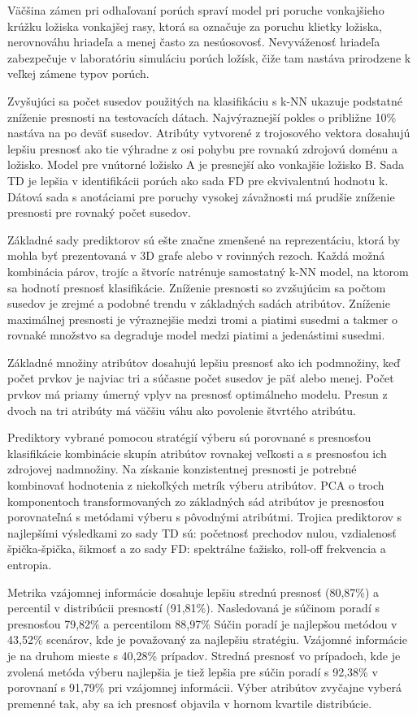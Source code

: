 Väčšina zámen pri odhaľovaní porúch spraví model pri poruche vonkajšieho krúžku ložiska vonkajšej rasy, ktorá sa označuje za poruchu klietky ložiska, nerovnováhu hriadeľa a menej často za nesúosovosť. Nevyváženosť hriadeľa zabezpečuje v laboratóriu simuláciu porúch ložísk, čiže tam nastáva prirodzene k veľkej zámene typov porúch.

Zvyšujúci sa počet susedov použitých na klasifikáciu s k-NN ukazuje podstatné zníženie presnosti na testovacích dátach. Najvýraznejší pokles o približne 10\% nastáva na po deväť susedov. Atribúty vytvorené z trojosového vektora dosahujú lepšiu presnosť ako tie výhradne z osi pohybu pre rovnakú zdrojovú doménu a ložisko. Model pre vnútorné ložisko A je presnejší ako vonkajšie ložisko B. Sada TD je lepšia v identifikácii porúch ako sada FD pre ekvivalentnú hodnotu k. Dátová sada s anotáciami pre poruchy vysokej závažnosti má prudšie zníženie presnosti pre rovnaký počet susedov.

Základné sady prediktorov sú ešte značne zmenšené na reprezentáciu, ktorá by mohla byť prezentovaná v 3D grafe alebo v rovinných rezoch. Každá možná kombinácia párov, trojíc a štvoríc natrénuje samostatný k-NN model, na ktorom sa hodnotí presnosť klasifikácie. Zníženie presnosti so zvzšujúcim sa počtom susedov je zrejmé a podobné trendu v základných sadách atribútov. Zníženie maximálnej presnosti je výraznejšie medzi tromi a piatimi susedmi a takmer o rovnaké množstvo sa degraduje model medzi piatimi a jedenástimi susedmi. 

Základné množiny atribútov dosahujú lepšiu presnosť ako ich podmnožiny, keď počet prvkov je najviac tri a súčasne počet susedov je päť alebo menej.
Počet prvkov má priamy úmerný vplyv na presnosť optimálneho modelu. Presun z dvoch na tri atribúty má väčšiu váhu ako povolenie štvrtého atribútu. 

Prediktory vybrané pomocou stratégií výberu sú porovnané s presnosťou klasifikácie kombinácie skupín atribútov rovnakej veľkosti a s presnosťou ich zdrojovej nadmnožiny.
Na získanie konzistentnej presnosti je potrebné kombinovať hodnotenia z niekoľkých metrík výberu atribútov. PCA o troch komponentoch transformovaných zo základných sád atribútov je presnosťou porovnateľná s metódami výberu s pôvodnými atribútmi. Trojica prediktorov s najlepšími výsledkami zo sady TD sú: početnosť prechodov nulou, vzdialenosť špička-špička, šikmosť a zo sady FD: spektrálne ťažisko, roll-off frekvencia a entropia.

Metrika vzájomnej informácie dosahuje lepšiu strednú presnosť (80,87\%) a percentil v distribúcii presností (91,81\%). Nasledovaná je súčinom poradí s presnosťou 79,82\% a percentilom 88,97\% Súčin poradí je najlepšou metódou v 43,52\% scenárov, kde je považovaný za najlepšiu stratégiu. Vzájomné informácie je na druhom mieste s 40,28\% prípadov. Stredná presnosť vo prípadoch, kde je zvolená metóda výberu najlepšia je tiež lepšia pre súčin poradí s 92,38\% v porovnaní s 91,79\% pri vzájomnej informácii. Výber atribútov zvyčajne vyberá premenné tak, aby sa ich presnosť objavila v hornom kvartile distribúcie.

